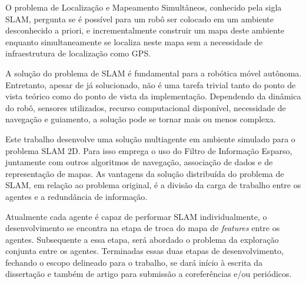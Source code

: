 O problema de Localização e Mapeamento Simultâneos, conhecido pela sigla SLAM, pergunta se é possível para um robô ser colocado em um ambiente 
desconhecido a priori, e incrementalmente construir um mapa deste 
ambiente enquanto simultaneamente se localiza neste mapa sem a 
necessidade de infraestrutura de localização como GPS.

A solução do problema de SLAM é fundamental para a robótica móvel 
autônoma. Entretanto, apesar de já solucionado, não é uma tarefa trivial 
tanto do ponto de vista teórico como do ponto de vista da implementação. 
Dependendo da dinâmica do robô, sensores utilizados, recurso 
computacional disponível, necessidade de navegação e guiamento, a solução 
pode se tornar mais ou menos complexa.

Este trabalho desenvolve uma solução multiagente em ambiente simulado 
para o problema SLAM 2D. Para isso emprega o uso do Filtro de Informação 
Esparso, juntamente com outros algoritmos de navegação, associação de 
dados e de representação de mapas. As vantagens da solução distribuída do 
problema de SLAM, em relação ao problema original, é a divisão da carga 
de trabalho entre os agentes e a redundância de informação.

Atualmente cada agente é capaz de performar SLAM individualmente, o desenvolvimento se encontra na etapa de troca do mapa de \textit{features} entre os agentes. Subsequente a essa etapa, será abordado o problema da exploração conjunta entre os agentes. Terminadas essas duas 
etapas de desenvolvimento, fechando o escopo delineado para o trabalho, 
se dará início à escrita da dissertação e também de artigo para submissão 
a coreferências e/ou periódicos.